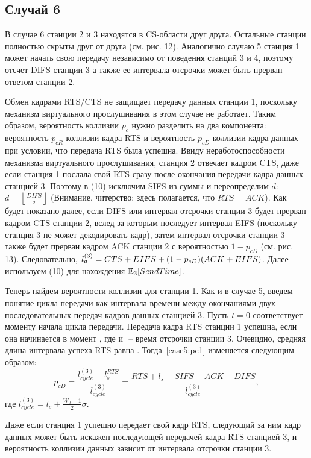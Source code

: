 {\subsection{Случай 6}
В случае 6 станции 2 и 3 находятся в CS-области друг друга. Остальные станции полностью скрыты друг от друга (см. рис. 12). Аналогично случаю 5 станция 1 может начать свою передачу независимо от поведения станций 3 и 4, поэтому отсчет DIFS станции 3 а также ее интервала отсрочки может быть прерван ответом станции 2.

Обмен кадрами RTS/CTS не защищает передачу данных станции 1, поскольку  механизм виртуального прослушивания в этом случае не работает. Таким образом, вероятность коллизии $p_c$ нужно разделить на два компонента: вероятность $p_{cR}$ коллизии кадра RTS и вероятность $p_{cD}$ коллизии кадра данных при условии, что передача RTS была успешна. Ввиду неработоспособности механизма виртуального прослушивания, станция 2 отвечает кадром CTS, даже если станция 1 послала свой RTS сразу после окончания передачи кадра данных станцией 3. Поэтому в (10) исключим SIFS из суммы и переопределим $d$: $d = \left\lfloor \frac{DIFS}{\sigma} \right\rfloor$ (Внимание, читерство: здесь полагается, что $RTS = ACK$).  Как будет показано далее, если DIFS или интервал отсрочки станции 3 будет прерван кадром CTS станции 2, вслед за которым последует интервал EIFS (поскольку станция 3 не может декодировать кадр), затем интервал отсрочки станции 3 также будет прерван кадром ACK станции 2 с вероятностью  $1-p_{cD}$ (см. рис. 13). Следовательно, $l_{a}^{(3)} = CTS + EIFS + (1-p_{cD})(ACK + EIFS)$. Далее используем (10) для нахождения $\mathbb{E}_{3}[SendTime]$.

Теперь найдем вероятности коллизии для станции 1. Как и в случае 5, введем понятие цикла передачи как интервала времени между окончаниями двух последовательных передач кадров данных станцией 3. Пусть $t = 0$  соответствует моменту начала цикла передачи.  Передача кадра RTS станции 1 успешна, если она начинается в момент , где  и  ­­­­ – ­­время отсрочки станции 3. Очевидно, средняя длина интервала  успеха RTS равна . Тогда~\eqref{case5:pc1} изменяется следующим образом:
\begin{equation}
p_{cD} = \frac{l_{cycle}^{(3)} - l_s^{RTS}}{l_{cycle}^{(3)}} = \frac{RTS + l_s - SIFS- ACK - DIFS}{l_{cycle}^{(3)}},
\end{equation}
где $l_{cycle}^{(3)} = l_s + \frac{W_0-1}{2}\sigma$.

Даже если станция 1 успешно передает свой кадр RTS, следующий за ним кадр данных может быть искажен последующей передачей кадра RTS станцией 3, и вероятность коллизии данных зависит от интервала отсрочки станции 3. 

}
